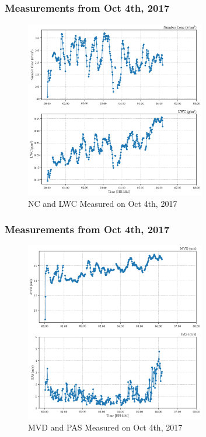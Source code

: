 \documentclass{beamer}
\begin{document}
\begin{frame}
    \frametitle{Measurements from Oct 4th, 2017}
    \begin{figure}
        \centering
        \includegraphics[width=0.7\textwidth]{img/cdp01.png}
        \caption{ NC and LWC Measured on Oct 4th, 2017 }
    \end{figure}
\end{frame}

\begin{frame}
    \frametitle{Measurements from Oct 4th, 2017}
    \begin{figure}
        \centering
        \includegraphics[width=0.7\textwidth]{img/cdp02.png}
        \caption{ MVD and PAS Measured on Oct 4th, 2017}
    \end{figure}
\end{frame}
\end{document}

